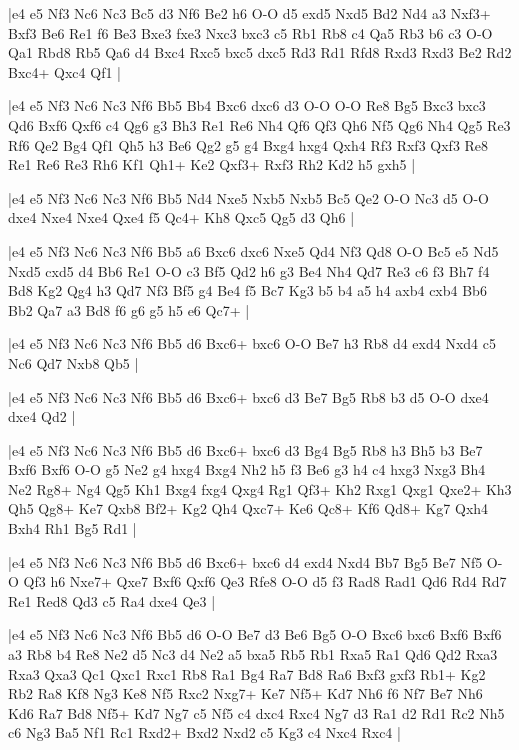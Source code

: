 \whitename{}
\blackname{}
\makegametitle
|e4 e5 Nf3 Nc6 Nc3 Bc5 d3 Nf6 Be2 h6 O-O d5 exd5 Nxd5 Bd2 Nd4 a3 Nxf3+ Bxf3 Be6 Re1 f6 Be3 Bxe3 fxe3 Nxc3 bxc3 c5 Rb1 Rb8 c4 Qa5 Rb3 b6 c3 O-O Qa1 Rbd8 Rb5 Qa6 d4 Bxc4 Rxc5 bxc5 dxc5 Rd3 Rd1 Rfd8 Rxd3 Rxd3 Be2 Rd2 Bxc4+ Qxc4 Qf1  |

\whitename{}
\blackname{}
\makegametitle
|e4 e5 Nf3 Nc6 Nc3 Nf6 Bb5 Bb4 Bxc6 dxc6 d3 O-O O-O Re8 Bg5 Bxc3 bxc3 Qd6 Bxf6 Qxf6 c4 Qg6 g3 Bh3 Re1 Re6 Nh4 Qf6 Qf3 Qh6 Nf5 Qg6 Nh4 Qg5 Re3 Rf6 Qe2 Bg4 Qf1 Qh5 h3 Be6 Qg2 g5 g4 Bxg4 hxg4 Qxh4 Rf3 Rxf3 Qxf3 Re8 Re1 Re6 Re3 Rh6 Kf1 Qh1+ Ke2 Qxf3+ Rxf3 Rh2 Kd2 h5 gxh5  |

\whitename{}
\blackname{}
\makegametitle
|e4 e5 Nf3 Nc6 Nc3 Nf6 Bb5 Nd4 Nxe5 Nxb5 Nxb5 Bc5 Qe2 O-O Nc3 d5 O-O dxe4 Nxe4 Nxe4 Qxe4 f5 Qc4+ Kh8 Qxc5 Qg5 d3 Qh6  |

\whitename{}
\blackname{}
\makegametitle
|e4 e5 Nf3 Nc6 Nc3 Nf6 Bb5 a6 Bxc6 dxc6 Nxe5 Qd4 Nf3 Qd8 O-O Bc5 e5 Nd5 Nxd5 cxd5 d4 Bb6 Re1 O-O c3 Bf5 Qd2 h6 g3 Be4 Nh4 Qd7 Re3 c6 f3 Bh7 f4 Bd8 Kg2 Qg4 h3 Qd7 Nf3 Bf5 g4 Be4 f5 Bc7 Kg3 b5 b4 a5 h4 axb4 cxb4 Bb6 Bb2 Qa7 a3 Bd8 f6 g6 g5 h5 e6 Qc7+  |

\whitename{}
\blackname{}
\makegametitle
|e4 e5 Nf3 Nc6 Nc3 Nf6 Bb5 d6 Bxc6+ bxc6 O-O Be7 h3 Rb8 d4 exd4 Nxd4 c5 Nc6 Qd7 Nxb8 Qb5  |

\whitename{}
\blackname{}
\makegametitle
|e4 e5 Nf3 Nc6 Nc3 Nf6 Bb5 d6 Bxc6+ bxc6 d3 Be7 Bg5 Rb8 b3 d5 O-O dxe4 dxe4 Qd2  |

\whitename{}
\blackname{}
\makegametitle
|e4 e5 Nf3 Nc6 Nc3 Nf6 Bb5 d6 Bxc6+ bxc6 d3 Bg4 Bg5 Rb8 h3 Bh5 b3 Be7 Bxf6 Bxf6 O-O g5 Ne2 g4 hxg4 Bxg4 Nh2 h5 f3 Be6 g3 h4 c4 hxg3 Nxg3 Bh4 Ne2 Rg8+ Ng4 Qg5 Kh1 Bxg4 fxg4 Qxg4 Rg1 Qf3+ Kh2 Rxg1 Qxg1 Qxe2+ Kh3 Qh5 Qg8+ Ke7 Qxb8 Bf2+ Kg2 Qh4 Qxc7+ Ke6 Qc8+ Kf6 Qd8+ Kg7 Qxh4 Bxh4 Rh1 Bg5 Rd1  |

\whitename{}
\blackname{}
\makegametitle
|e4 e5 Nf3 Nc6 Nc3 Nf6 Bb5 d6 Bxc6+ bxc6 d4 exd4 Nxd4 Bb7 Bg5 Be7 Nf5 O-O Qf3 h6 Nxe7+ Qxe7 Bxf6 Qxf6 Qe3 Rfe8 O-O d5 f3 Rad8 Rad1 Qd6 Rd4 Rd7 Re1 Red8 Qd3 c5 Ra4 dxe4 Qe3  |

\whitename{}
\blackname{}
\makegametitle
|e4 e5 Nf3 Nc6 Nc3 Nf6 Bb5 d6 O-O Be7 d3 Be6 Bg5 O-O Bxc6 bxc6 Bxf6 Bxf6 a3 Rb8 b4 Re8 Ne2 d5 Nc3 d4 Ne2 a5 bxa5 Rb5 Rb1 Rxa5 Ra1 Qd6 Qd2 Rxa3 Rxa3 Qxa3 Qc1 Qxc1 Rxc1 Rb8 Ra1 Bg4 Ra7 Bd8 Ra6 Bxf3 gxf3 Rb1+ Kg2 Rb2 Ra8 Kf8 Ng3 Ke8 Nf5 Rxc2 Nxg7+ Ke7 Nf5+ Kd7 Nh6 f6 Nf7 Be7 Nh6 Kd6 Ra7 Bd8 Nf5+ Kd7 Ng7 c5 Nf5 c4 dxc4 Rxc4 Ng7 d3 Ra1 d2 Rd1 Rc2 Nh5 c6 Ng3 Ba5 Nf1 Rc1 Rxd2+ Bxd2 Nxd2 c5 Kg3 c4 Nxc4 Rxc4  |

